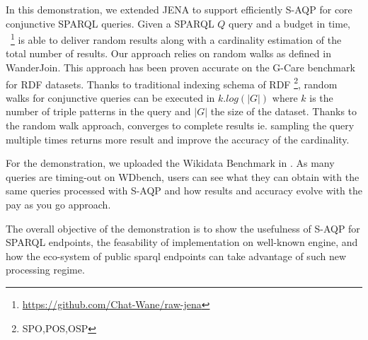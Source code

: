   In this demonstration, we extended JENA to support efficiently
  S-AQP for core conjunctive
  SPARQL queries.  Given a SPARQL $Q$ query and a budget in time,
  \NAME~\footnote{\url{https://github.com/Chat-Wane/raw-jena}} is able
  to deliver random results along with a cardinality estimation of the
  total number of results. Our approach relies on random
 walks as defined in WanderJoin\cite{li2016wanderjoin}. This approach
 has been proven accurate on the G-Care
 benchmark\cite{DBLP:conf/sigmod/ParkKBKHH20} for RDF datasets. Thanks
 to traditional indexing schema of RDF \footnote{SPO,POS,OSP}, random
 walks for conjunctive queries can be executed in $k.log(|G|)$ where
 $k$ is the number of triple patterns in the query and $|G|$ the size
 of the dataset. Thanks to the random walk approach, \NAME converges
 to complete results ie. sampling the query multiple times returns
  more result and improve the accuracy of the cardinality.

  For the demonstration, we uploaded the Wikidata
  Benchmark\cite{angles2022wdbench} in \NAME. As many queries are
  timing-out on WDbench, users can see what they can obtain with the
  same queries processed with S-AQP and how results and
  accuracy evolve with the pay as you go approach.

  The overall objective of the demonstration is to show the usefulness
  of S-AQP for SPARQL endpoints, the feasability of implementation on
  well-known engine, and how the eco-system of public sparql endpoints
  can take advantage of such new processing regime.








